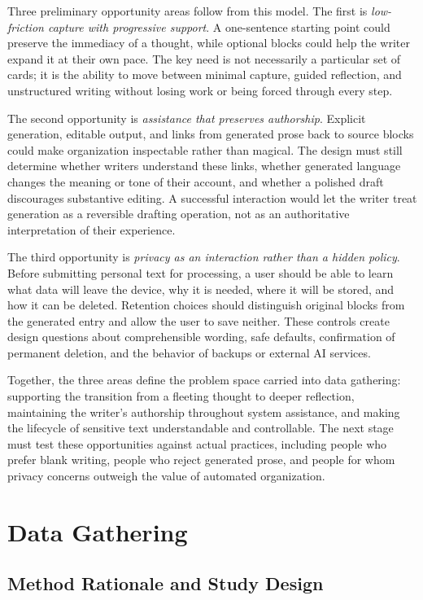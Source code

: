 \documentclass[sigconf,nonacm]{acmart}
\begin{document}
Three preliminary opportunity areas follow from this model. The first is
\emph{low-friction capture with progressive support}. A one-sentence starting
point could preserve the immediacy of a thought, while optional blocks could
help the writer expand it at their own pace. The key need is not necessarily a
particular set of cards; it is the ability to move between minimal capture,
guided reflection, and unstructured writing without losing work or being forced
through every step.

The second opportunity is \emph{assistance that preserves authorship}. Explicit
generation, editable output, and links from generated prose back to source
blocks could make organization inspectable rather than magical. The design
must still determine whether writers understand these links, whether generated
language changes the meaning or tone of their account, and whether a polished
draft discourages substantive editing. A successful interaction would let the
writer treat generation as a reversible drafting operation, not as an
authoritative interpretation of their experience.

The third opportunity is \emph{privacy as an interaction rather than a hidden
policy}. Before submitting personal text for processing, a user should be able
to learn what data will leave the device, why it is needed, where it will be
stored, and how it can be deleted. Retention choices should distinguish original
blocks from the generated entry and allow the user to save neither. These
controls create design questions about comprehensible wording, safe defaults,
confirmation of permanent deletion, and the behavior of backups or external AI
services.

Together, the three areas define the problem space carried into data gathering:
supporting the transition from a fleeting thought to deeper reflection,
maintaining the writer's authorship throughout system assistance, and making
the lifecycle of sensitive text understandable and controllable. The next stage
must test these opportunities against actual practices, including people who
prefer blank writing, people who reject generated prose, and people for whom
privacy concerns outweigh the value of automated organization.

\section{Data Gathering}

\subsection{Method Rationale and Study Design}
\end{document}
